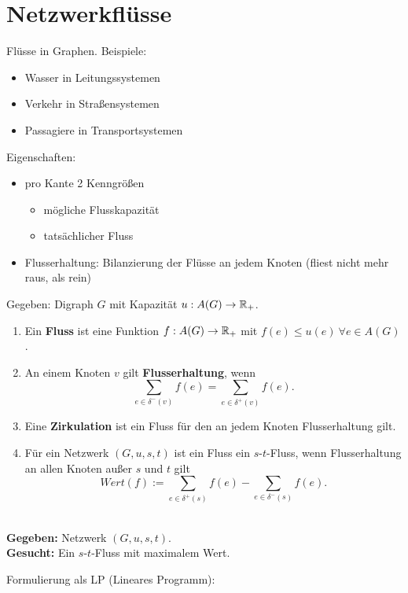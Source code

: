 \section{Netzwerkflüsse}
Flüsse in Graphen. Beispiele:
\begin{itemize}
	\item Wasser in Leitungssystemen
	\item Verkehr in Straßensystemen
	\item Passagiere in Transportsystemen
\end{itemize}
Eigenschaften:
\begin{itemize}
	\item pro Kante 2 Kenngrößen
	\begin{itemize}
		\item mögliche Flusskapazität
		\item tatsächlicher Fluss
	\end{itemize}
	\item \dq Flusserhaltung\dq : Bilanzierung der Flüsse an jedem Knoten (\dq fliest nicht mehr raus, als rein\dq)
\end{itemize}
\begin{definition}
	Gegeben: Digraph $G$ mit Kapazität $u: A(G) \to \mathbb{R}_+$.
	\begin{enumerate}
		\item Ein \textbf{Fluss} ist eine Funktion $f: A(G) \to \mathbb{R}_+$ mit $f(e) \le u(e)~\forall e\in A(G)$.
		\item An einem Knoten $v$ gilt \textbf{Flusserhaltung}, wenn \[\sum_{e\in \delta^-(v)} f(e) = \sum_{e\in \delta^+(v)} f(e).\]
		\item Eine \textbf{Zirkulation} ist ein Fluss für den an jedem Knoten Flusserhaltung gilt.
		\item Für ein Netzwerk $(G, u, s, t)$ ist ein Fluss ein $s$-$t$-Fluss, wenn Flusserhaltung an allen Knoten außer $s$ und $t$ gilt \[Wert(f) :=\sum_{e\in \delta^+(s)} f(e) - \sum_{e\in \delta^-(s)} f(e).\]
	\end{enumerate}
\end{definition}
\begin{problem}~\\[5pt]
\hspace*{10pt}\textbf{Gegeben: }Netzwerk $(G, u, s, t)$.\\[5pt]
\hspace*{10pt}\textbf{Gesucht: }Ein $s$-$t$-Fluss mit maximalem Wert.
\end{problem}
Formulierung als LP (Lineares Programm):
